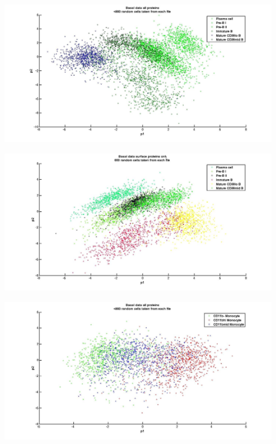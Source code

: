\documentclass{article} %
\begin{document}
\begin{minipage}{\linewidth}
\centering
  \includegraphics[width=120mm]{Basal_AllProtein_BCells.jpg}
\end{minipage}

\begin{minipage}{\linewidth}
\centering
  \includegraphics[width=120mm]{Basal_SurfaceProtein_BCells.jpg}
\end{minipage}

\begin{minipage}{\linewidth}
\centering
  \includegraphics[width=120mm]{Basal_AllProtein_Monocytes.jpg}
\end{minipage}
\end{document}
